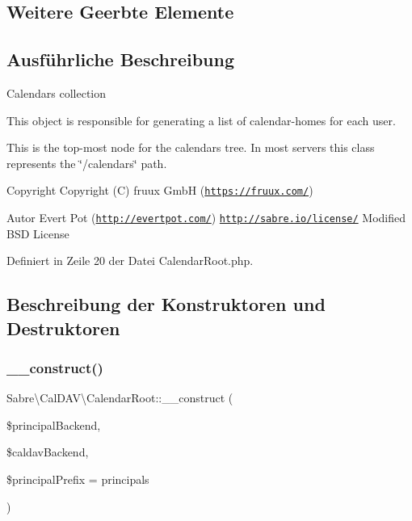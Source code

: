 \subsection*{Weitere Geerbte Elemente}


\subsection{Ausführliche Beschreibung}
Calendars collection

This object is responsible for generating a list of calendar-\/homes for each user.

This is the top-\/most node for the calendars tree. In most servers this class represents the \char`\"{}/calendars\char`\"{} path.

\begin{DoxyCopyright}{Copyright}
Copyright (C) fruux GmbH (\href{https://fruux.com/}{\tt https\+://fruux.\+com/}) 
\end{DoxyCopyright}
\begin{DoxyAuthor}{Autor}
Evert Pot (\href{http://evertpot.com/}{\tt http\+://evertpot.\+com/})  \href{http://sabre.io/license/}{\tt http\+://sabre.\+io/license/} Modified B\+SD License 
\end{DoxyAuthor}


Definiert in Zeile 20 der Datei Calendar\+Root.\+php.



\subsection{Beschreibung der Konstruktoren und Destruktoren}
\mbox{\label{class_sabre_1_1_cal_d_a_v_1_1_calendar_root_a33589a31edb7c16ea8914075cccdd9e0}} 
\subsubsection{\texorpdfstring{\+\_\+\+\_\+construct()}{\_\_construct()}}
{\footnotesize\ttfamily Sabre\textbackslash{}\+Cal\+D\+A\+V\textbackslash{}\+Calendar\+Root\+::\+\_\+\+\_\+construct (\begin{DoxyParamCaption}\item[{Principal\+Backend\textbackslash{}\+Backend\+Interface}]{\$principal\+Backend,  }\item[{\mbox{\hyperlink{interface_sabre_1_1_cal_d_a_v_1_1_backend_1_1_backend_interface}{Backend\textbackslash{}\+Backend\+Interface}}}]{\$caldav\+Backend,  }\item[{}]{\$principal\+Prefix = {\ttfamily \textquotesingle{}principals\textquotesingle{}} }\end{DoxyParamCaption})}

